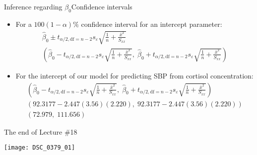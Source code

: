 \documentclass[xcolor=dvipsnames]{beamer}
\begin{document}
\begin{frame}{Inference regarding $\beta_0$}{Confidence intervals}
	\begin{itemize}
		\item For a $100(1-\alpha)\%$ confidence interval for an intercept parameter: 
		\begin{gather*}
		\hat{\beta}_0 \pm t_{\alpha / 2,\text{df}=n-2} {s_{\varepsilon} \sqrt{\frac{1}{n}+\frac{\bar{x}^2}{S_{xx}}}} \\
		\left(\hat{\beta}_0 - t_{\alpha / 2,\text{df}=n-2} {s_{\varepsilon} \sqrt{\frac{1}{n}+\frac{\bar{x}^2}{S_{xx}}}},\; \hat{\beta}_0 + t_{\alpha / 2,\text{df}=n-2} {s_{\varepsilon} \sqrt{\frac{1}{n}+\frac{\bar{x}^2}{S_{xx}}}}\right)
		\end{gather*}
		\item For the intercept of our model for predicting SBP from cortisol concentration:
		\begin{gather*}
		\left(\hat{\beta}_0 - t_{\alpha / 2,\text{df}=n-2} {s_{\varepsilon} \sqrt{\frac{1}{n}+\frac{\bar{x}^2}{S_{xx}}}},\; \hat{\beta}_0 + t_{\alpha / 2,\text{df}=n-2} {s_{\varepsilon} \sqrt{\frac{1}{n}+\frac{\bar{x}^2}{S_{xx}}}}\right) \\
		(92.3177 - 2.447(3.56)(2.220), \; 92.3177 - 2.447(3.56)(2.220)) \\
		(72.979,\; 111.656)
		\end{gather*}
	\end{itemize}
\end{frame}

\begin{frame}{The end of Lecture \#18}
	\begin{center}
		\texttt{[image: DSC\_0379\_01]}
	\end{center}
\end{frame}
\end{document}
